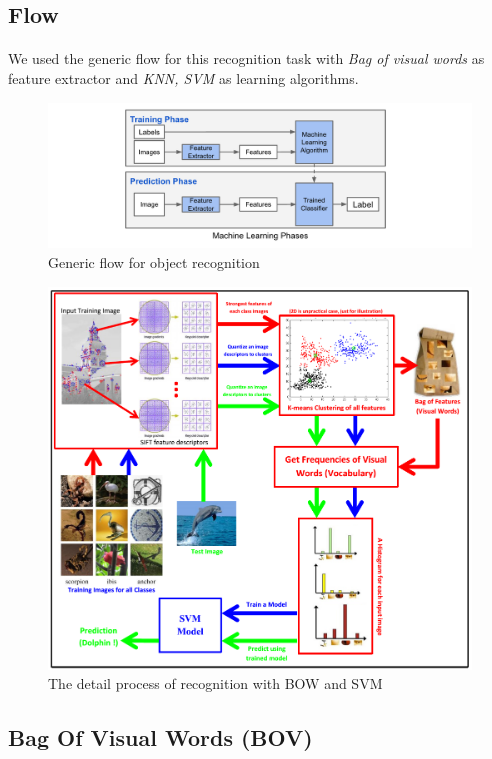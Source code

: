 \subsection{Flow}
\paragraph*{}
We used the generic flow for this recognition task with \textit{Bag of visual words} as feature extractor and \textit{KNN, SVM} as learning algorithms. 

\begin{figure}[h!]
	\centering
	\includegraphics[width=\linewidth]{images/flow/generic.png}
	\caption{Generic flow for object recognition}
\end{figure}

\begin{figure}[h!]
	\centering
	\includegraphics[width=0.8\linewidth]{images/flow/bow_svm.png}
	\caption[BOV-SVM flow chart]{The detail process of recognition with BOW and SVM}
\end{figure}

\subsection{Bag Of Visual Words (BOV)}
